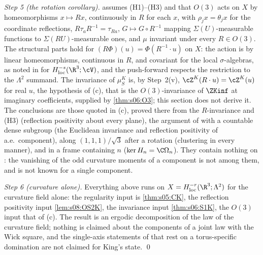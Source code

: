 \emph{Step 5 (the rotation corollary).} \cite[p:cor:rotcor]{SymPhase} assumes (H1)--(H3) and that $O(3)$ acts on $X$ by homeomorphisms $x\mapsto Rx$, continuously in $R$ for each $x$, with $\rho_jx=\theta_jx$ for the coordinate reflections, $R\tau_aR^{-1}=\tau_{Ra}$, $G\mapsto G\circ R^{-1}$ mapping $\Sigma(U)$-measurable functions to $\Sigma(RU)$-measurable ones, and $\mu$ invariant under every $R\in O(3)$. The structural parts hold for $(R\Phi)(u)=\Phi(R^{-1}\cdot u)$ on $X$: the action is by linear homeomorphisms, continuous in $R$, and covariant for the local $\sigma$-algebras, as noted in \cite[add:rotcond-rem(1)]{SymPhase} for $H^{-s}_{\mathrm{loc}}(\R^3;\cV)$, and the push-forward respects the restriction to the $\Lambda^2$ summand. The invariance of $\mu^K_S$ is, by Step~2(v), $\cZ^K(R\cdot u)=\cZ^K(u)$ for real $u$, the hypothesis of (c), that is the $O(3)$-invariance of $\ZKinf$ at imaginary coefficients, supplied by \cref{thm:s06:O3}; this section does not derive it. The conclusions are those quoted in (c), proved there from the $R$-invariance and (H3) (reflection positivity about every plane), the argument of \cite[thm:D:decomp]{SymPhase} with a countable dense subgroup (the Euclidean invariance and reflection positivity of a.e.\ component), \cite[thm:D:diag]{SymPhase} along $(1,1,1)/\sqrt3$ after a rotation (clustering in every manner), and \cite[add:OS4rel(a)]{SymPhase} in a frame containing $n$ ($\ker H_n=\C\Omega_n$). They contain nothing on \OSth: the vanishing of the odd curvature moments of a component is not among them, and is not known for a single component.

\emph{Step 6 (curvature alone).} Everything above runs on $X=H^{-r}_{\mathrm{loc}}(\R^3;\Lambda^2)$ for the curvature field alone: the regularity input is \cref{thm:s05:CK}, the reflection positivity input \cref{lem:s08:OS2K}, the invariance input \cref{thm:s06:S1K}, the $O(3)$ input that of (c). The result is an ergodic decomposition of the law of the curvature field; nothing is claimed about the components of a joint law with the Wick square, and the single-axis statements of \cite{SymPhase} that rest on a torus-specific domination are not claimed for King's state. \qed

